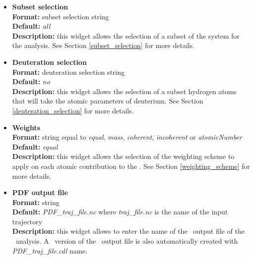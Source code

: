 \documentclass[a4paper,11pt]{report}
\newcommand{\nm}{\textit{nm}}
\begin{document}
\begin{itemize}
For example,
\begin{itemize}
\item \textit{0:10:1} will compute \PDF\ for \textit{r = 0, 1, 2, 3, 4, 5, 6, 7, 8, 9, 10} \nm .
\item \textit{3:7:1.2} will compute \PDF\ for \textit{r = 3, 4.2, 5.4, 6.6} \nm .
\end{itemize}

\hypertarget{pdf_subset_selection}{}
\item \textbf{Subset selection}\\
\textbf{Format:} subset selection string\\
\textbf{Default:} \textit{all}\\
\textbf{Description:} this widget allows the selection of a subset of the system for the analysis. 
See Section \ref{subset_selection} for more details.

\hypertarget{pdf_deuteration_selection}{}
\item \textbf{Deuteration selection}\\
\textbf{Format:} deuteration selection string\\
\textbf{Default:} \textit{no}\\
\textbf{Description:} this widget allows the selection of a subset hydrogen atoms that will take the atomic parameters 
of deuterium. See Section \ref{deuteration_selection} for more details.

\hypertarget{pdf_weights}{}
\item \textbf{Weights}\\
\textbf{Format:} string equal to \textit{equal}, \textit{mass}, \textit{coherent}, \textit{incoherent} or \textit{atomicNumber}\\
\textbf{Default:} \textit{equal}\\
\textbf{Description:} this widget allows the selection of the weighting scheme to apply on each atomic contribution 
to the \PDF . See Section \ref{weighting_scheme} for more details. 

\hypertarget{pdf_pdf_output_file}{}
\item \textbf{PDF output file}\\
\textbf{Format:} string\\
\textbf{Default:} \textit{PDF\_traj\_file.nc} where \textit{traj\_file.nc} is the name of the input trajectory\\
\textbf{Description:} this widget allows to enter the name of the \NetCDF\ output file of the \PDF\ analysis. A \CDL\ 
version of the \NetCDF\ output file is also automatically created with \textit{PDF\_traj\_file.cdl} name.
\end{itemize}
\end{document}
